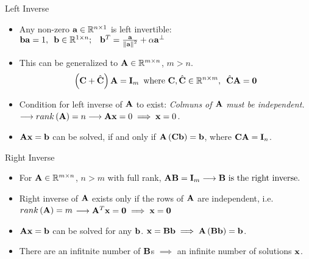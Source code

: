 \documentclass[aspectratio=169]{beamer}
\let\olditem\item
\renewcommand{\item}{\setlength{\itemsep}{\fill}\olditem}
\def\mf{\ensuremath\mathbf}
\def\mb{\ensuremath\mathbb}
\def\lp{\ensuremath\left(}
\def\rp{\ensuremath\right)}
\begin{document}
\begin{frame}[t]{Left Inverse}
  \begin{itemize}
    \item Any non-zero $\mf{a} \in \mb{R}^{n \times 1} $ is left invertible: $ \mf{ba} = 1, \,\,\, \mf{b} \in \mb{R}^{1 \times n}; \,\,\,\,\, \mf{b}^T = \frac{\mf{a}}{\left\lVert \mf{a}\right\rVert^2} + \alpha \mf{a}^{\perp} $

    \item This can be generalized to $\mf{A} \in \mb{R}^{m \times n}$, $m > n$.
    \[ \lp \mf{C} + \hat{\mf{C}} \rp \mf{A} = \mf{I}_m \,\,\, \text{where } \mf{C}, \hat{\mf{C}} \in \mb{R}^{n \times m},\,\,\,{ }\hat{\mf{C}}\mf{A} = \mf{0}\]

    \item Condition for left inverse of $\mf{A}$ to exist: \textit{Colmuns of $\mf{A}$ must be independent.} $\longrightarrow rank\left(\mf{A}\right) = n \longrightarrow \mf{Ax} = 0 \implies \mf{x} = 0$.

    \item $\mf{Ax = b}$ can be solved, if and only if $\mf{A}\lp\mf{C}\mf{b}\rp = \mf{b}$, where $\mf{CA} = \mf{I}_n$.
\end{itemize}
\end{frame}


\begin{frame}[t]{Right Inverse}
  \begin{itemize}
    \item For $\mf{A} \in \mb{R}^{m \times n}$, $n > m$ with full rank, $\mf{AB} = \mf{I}_m \longrightarrow \mf{B} \text{ is the right inverse.}$

    \item Right inverse of $\mf{A}$ exists only if the rows of $\mf{A}$ are independent, i.e. $rank\left(\mf{A}\right) = m$ $\longrightarrow \mf{A}^T\mf{x} = \mf{0} \implies \mf{x} = \mf{0}$

    \item $\mf{Ax} = \mf{b}$ can be solved for any $\mf{b}$. $\mf{x} = \mf{Bb} \implies \mf{A}\left(\mf{Bb}\right) = \mf{b}$. 

    \item There are an infitnite number of $\mf{B}$s $\implies$ an infinite number of solutions $\mf{x}$.
\end{itemize}
\end{frame}
\end{document}
